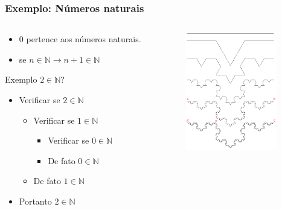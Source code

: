 \documentclass[10pt, handout]{beamer}
\begin{document}
\begin{frame}
  \frametitle{Exemplo: Números naturais}
  \begin{columns}[t]
    \begin{column}{6cm}
      \begin{itemize}
        \item $0$ pertence aos números naturais.
        \item se $n \in \mathds{N} \rightarrow n+1 \in \mathds{N}$
      \end{itemize}
      \vfill
      Exemplo $2 \in \mathds{N}$?
      \begin{itemize}
        \item <1- | alert@1>Verificar se $2 \in \mathds{N}$
              \begin{itemize}
                \item <2- | alert@2>Verificar se $1 \in \mathds{N}$
                      \begin{itemize}
                        \item<3- | alert@3> Verificar se $0 \in \mathds{N}$
                        \item<4- | alert@4> De fato $0 \in \mathds{N}$
                      \end{itemize}
                \item <5- | alert@5>De fato $1 \in \mathds{N}$
              \end{itemize}
        \item<6- | alert@6> Portanto $2 \in \mathds{N}$
      \end{itemize}
    \end{column}
    \begin{column}{6cm}
      \begin{figure}[h]
        \begin{center}
          \includegraphics[width=4cm]{fig/img02.png}
        \end{center}
      \end{figure}
    \end{column}
  \end{columns}
\end{frame}
\end{document}
